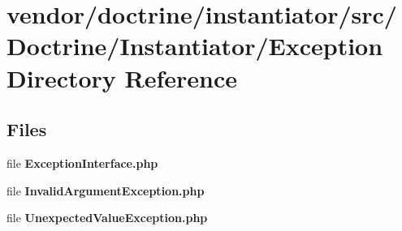 \section{vendor/doctrine/instantiator/src/\+Doctrine/\+Instantiator/\+Exception Directory Reference}
\label{dir_cbaaf9a2666349ba52d08a5879d838d7}
\subsection*{Files}
\begin{DoxyCompactItemize}
\item 
file {\bf Exception\+Interface.\+php}
\item 
file {\bf Invalid\+Argument\+Exception.\+php}
\item 
file {\bf Unexpected\+Value\+Exception.\+php}
\end{DoxyCompactItemize}
